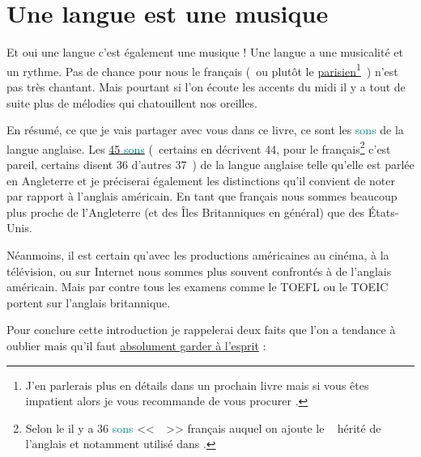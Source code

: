 \newpage

\section{Une langue est une musique}\label{sec:music}
Et oui une langue c'est également une musique ! Une langue a une
musicalité et un rythme. Pas de chance pour nous le français (~ou
plutôt le \underline{parisien}\footnote{J'en parlerais plus en détails
  dans un prochain livre mais si vous êtes impatient alors je vous
  recommande de vous procurer \FL.}~)
n'est pas très chantant. Mais pourtant si l'on écoute les accents du
midi il y a tout de suite plus de mélodies qui chatouillent nos
oreilles. 

En résumé, ce que je vais partager avec vous dans ce livre, ce
sont les \textcolor{teal}{sons} de la langue anglaise. Les \href{https://pronunciationstudio.com/45-Sounds/}{45 \textcolor{teal}{sons}} (~certains en
décrivent 44, pour le français\footnote{Selon le \GE il y a 36 \textcolor{teal}{sons}
  <<~~>> français auquel on ajoute le \son~
  hérité de l'anglais et notamment utilisé dans .} c'est
pareil, certains disent 36 d'autres 37~) de la langue anglaise telle
qu'elle est parlée en Angleterre et je préciserai également les
distinctions qu'il convient de noter par rapport à l'anglais
américain. En tant que français nous sommes beaucoup plus proche de
l'Angleterre (et des Îles Britanniques en général) que des
\'Etats-Unis.

Néanmoins, il est certain qu'avec les productions américaines au
cinéma, à la télévision, ou sur Internet nous sommes plus souvent
confrontés à de l'anglais américain. Mais par contre tous les examens
comme le TOEFL ou le TOEIC portent sur l'anglais britannique. 

Pour conclure cette introduction je rappelerai deux faits que l'on a tendance à oublier mais qu'il faut \underline{absolument garder à l'esprit} :

